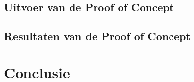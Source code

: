 \subsection*{Uitvoer van de Proof of Concept}
\subsection*{Resultaten van de Proof of Concept}

\section*{Conclusie}

